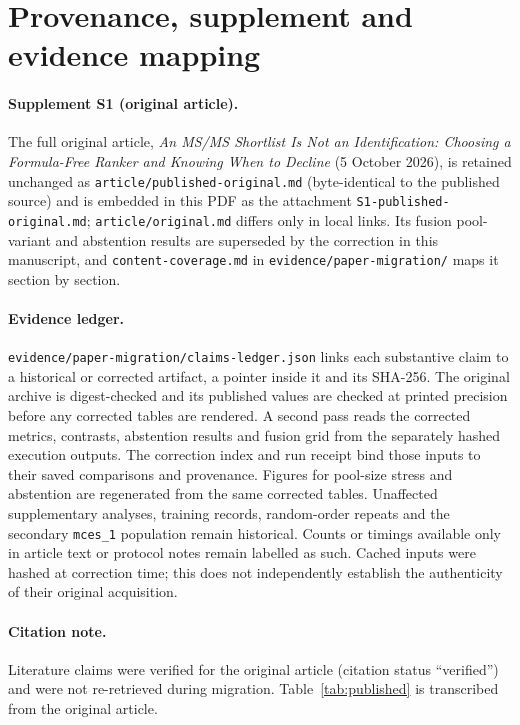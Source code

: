 \documentclass[11pt]{article}
\newcommand{\m}[1]{\texttt{#1}}
\begin{document}
\section{Provenance, supplement and evidence mapping}\label{app:provenance}
\paragraph{Supplement S1 (original article).} The full original article, \emph{An MS/MS Shortlist Is Not an Identification:
Choosing a Formula-Free Ranker and Knowing When to Decline} (5 October 2026), is retained unchanged as
\m{article/published-original.md} (byte-identical to the published source) and is embedded in this PDF as the attachment
\m{S1-published-original.md}; \m{article/original.md} differs only in local links. Its fusion pool-variant and abstention results are superseded by the correction in this manuscript, and \m{content-coverage.md} in \m{evidence/paper-migration/} maps it section by section.

\paragraph{Evidence ledger.} \m{evidence/paper-migration/claims-ledger.json} links each substantive claim to a
historical or corrected artifact, a pointer inside it and its SHA-256. The original archive is digest-checked and its
published values are checked at printed precision before any corrected tables are rendered. A second pass reads the
corrected metrics, contrasts, abstention results and fusion grid from the separately hashed execution outputs.
The correction index and run receipt bind those inputs to their saved comparisons and provenance. Figures for pool-size
stress and abstention are regenerated from the same corrected tables. Unaffected supplementary analyses, training records,
random-order repeats and the secondary \m{mces\_1} population remain historical. Counts or timings available only in
article text or protocol notes remain labelled as such. Cached inputs were hashed at correction time; this does not
independently establish the authenticity of their original acquisition.

\paragraph{Citation note.} Literature claims were verified for the original article (citation status ``verified'') and were not
re-retrieved during migration. Table~\ref{tab:published} is transcribed from the original article.
\end{document}
